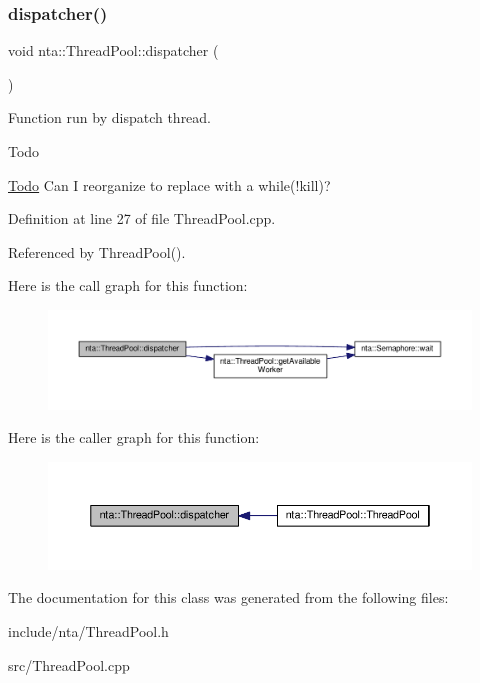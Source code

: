 \subsubsection{\texorpdfstring{dispatcher()}{dispatcher()}}
{\footnotesize\ttfamily void nta\+::\+Thread\+Pool\+::dispatcher (\begin{DoxyParamCaption}{ }\end{DoxyParamCaption})\hspace{0.3cm}{\ttfamily [private]}}



Function run by dispatch thread. 

\begin{DoxyRefDesc}{Todo}
\item[\hyperlink{todo__todo000005}{Todo}]Can I reorganize to replace with a while(!kill)? \end{DoxyRefDesc}


Definition at line 27 of file Thread\+Pool.\+cpp.



Referenced by Thread\+Pool().

Here is the call graph for this function\+:
\nopagebreak
\begin{figure}[H]
\begin{center}
\leavevmode
\includegraphics[width=350pt]{d3/d68/classnta_1_1ThreadPool_ad439d625834a107a84c62c1ddcf2e936_cgraph}
\end{center}
\end{figure}
Here is the caller graph for this function\+:
\nopagebreak
\begin{figure}[H]
\begin{center}
\leavevmode
\includegraphics[width=350pt]{d3/d68/classnta_1_1ThreadPool_ad439d625834a107a84c62c1ddcf2e936_icgraph}
\end{center}
\end{figure}


The documentation for this class was generated from the following files\+:\begin{DoxyCompactItemize}
\item 
include/nta/Thread\+Pool.\+h\item 
src/Thread\+Pool.\+cpp\end{DoxyCompactItemize}
